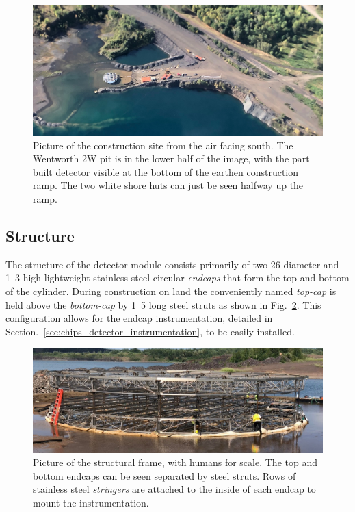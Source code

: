 \begin{figure} %
    \includegraphics[width=\textwidth]{diagrams/4-chips/from_the_air.jpeg}
    \caption[Picture of the \chipsfive construction site from the air.]
    {Picture of the \chipsfive construction site from the air facing south. The Wentworth 2W pit
        is in the lower half of the image, with the part built \chipsfive detector visible at the
        bottom of the earthen construction ramp. The two white shore huts can just be seen halfway
        up the ramp.}
    \label{fig:from_the_sky}
\end{figure}

\subsection{Structure} %
\label{sec:chips_detector_structure} %

The structure of the \chipsfive detector module consists primarily of two \unit{26}{}
diameter and \unit{1.3}{} high lightweight stainless steel circular \emph{endcaps} that
form the top and bottom of the cylinder. During construction on land the conveniently named
\emph{top-cap} is held above the \emph{bottom-cap} by \unit{1.5}{} long steel struts as
shown in Fig.~\ref{fig:frame}. This configuration allows for the endcap instrumentation, detailed
in Section.~\ref{sec:chips_detector_instrumentation}, to be easily installed.

\begin{figure} %
    \includegraphics[width=\textwidth]{diagrams/4-chips/frame.jpeg}
    \caption[Picture of the \chipsfive structural frame.]
    {Picture of the \chipsfive structural frame, with humans for scale. The top and bottom endcaps
        can be seen separated by steel struts. Rows of stainless steel \emph{stringers}
        are attached to the inside of each endcap to mount the instrumentation.}
    \label{fig:frame}
\end{figure}

